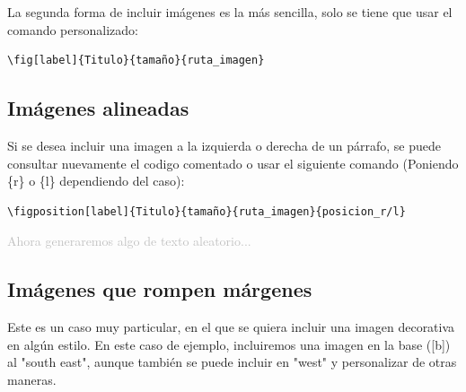 La segunda forma de incluir imágenes es la más sencilla, solo se tiene que usar el comando personalizado:
\begin{verbatim} 
\fig[label]{Titulo}{tamaño}{ruta_imagen}
\end{verbatim}



\subsection{Imágenes alineadas}
Si se desea incluir una imagen a la izquierda o derecha de un párrafo, se puede consultar nuevamente el codigo comentado o usar el siguiente comando (Poniendo \{r\} o \{l\} dependiendo del caso):
\begin{verbatim} 
\figposition[label]{Titulo}{tamaño}{ruta_imagen}{posicion_r/l}
\end{verbatim}




\textcolor{silver}{
    Ahora generaremos algo de texto aleatorio...
    \lipsum[2]
}

\subsection{Imágenes que rompen márgenes}

Este es un caso muy particular, en el que se quiera incluir una imagen decorativa en algún estilo. En este caso de ejemplo, incluiremos una imagen en la base ([b]) al "south east", aunque también se puede incluir en "west" y personalizar de otras maneras.

